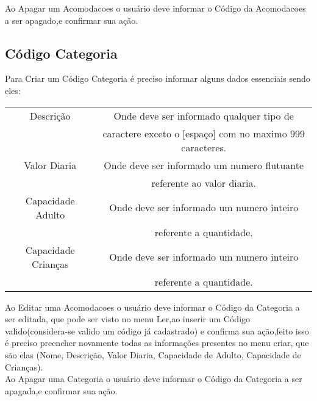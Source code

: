\documentclass[titlepage]{article}
\begin{document}
				Ao Apagar um Acomodacoes o usuário deve informar o Código da Acomodacoes a ser apagado,e confirmar sua ação.\\


				\newpage
				\subsection{Código Categoria}
					Para Criar um Código Categoria é preciso informar alguns dados essenciais sendo eles:
				\begin{table}[h]%
					\begin{tabular}{|c|c|}
					\hline
					Descrição  & Onde deve ser informado qualquer tipo de \\& caractere exceto o [espaço] com no maximo 999 caracteres.\\
					\hline
					Valor Diaria  & Onde deve ser informado um numero flutuante \\& referente ao valor diaria.\\
					\hline
					Capacidade Adulto  & Onde deve ser informado um numero inteiro \\& referente a quantidade.\\
					\hline
					Capacidade Crianças & Onde deve ser informado um numero inteiro \\& referente a quantidade.\\
					\hline
					\end{tabular}
				\end{table}
				Ao Editar uma Acomodacoes o usuário deve informar o Código da Categoria a ser editada, que pode ser visto no menu Ler,ao inserir um Código valido(considera-se valido um código já cadastrado) e confirma sua ação,feito isso é preciso preencher novamente todas as informações presentes no menu criar, que são elas (Nome, Descrição, Valor Diaria, Capacidade de Adulto, Capacidade de Crianças).\\

				Ao Apagar uma Categoria o usuário deve informar o Código da Categoria a ser apagada,e confirmar sua ação. \\




				\newpage
\end{document}
